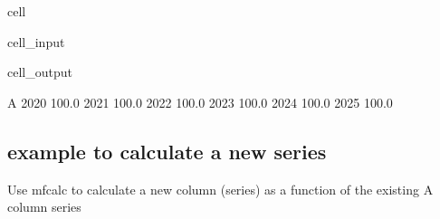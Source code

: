 \documentclass[letterpaper,10pt,english]{jupyterBook}
\begin{document}
\begin{sphinxuseclass}{cell}\begin{sphinxVerbatimInput}

\begin{sphinxuseclass}{cell_input}
\begin{sphinxVerbatim}[commandchars=\\\{\}]
                                   
                                               
    \PYG{p}{[}    \PYG{p}{]}           
    \PYG{p}{[}\PYG{p}{]}                                  
   
\end{sphinxVerbatim}

\end{sphinxuseclass}\end{sphinxVerbatimInput}
\begin{sphinxVerbatimOutput}

\begin{sphinxuseclass}{cell_output}
\begin{sphinxVerbatim}[commandchars=\\\{\}]
          A
2020  100.0
2021  100.0
2022  100.0
2023  100.0
2024  100.0
2025  100.0
\end{sphinxVerbatim}

\end{sphinxuseclass}\end{sphinxVerbatimOutput}

\end{sphinxuseclass}

\subsection{ example to calculate a new series}
\label{\detokenize{content/04_PythonEssentials/mfcalc:mfcalc-example-to-calculate-a-new-series}}
\sphinxAtStartPar
Use  mfcalc to calculate a new column (series) as a function of the existing A column series
\end{document}
